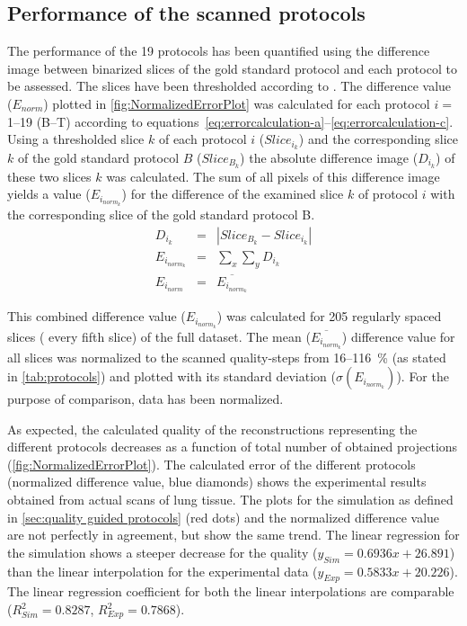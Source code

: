 \subsection{Performance of the scanned protocols}
The performance of the 19 protocols has been quantified using the difference image between binarized slices of the gold standard protocol and each protocol to be assessed. The slices have been thresholded according to \citet{Otsu1979}. The difference value ($E_{norm}$) plotted in \autoref{fig:NormalizedErrorPlot} was calculated for each protocol $i=$1--19 (B--T) according to equations~\ref{eq:errorcalculation-a}--\ref{eq:errorcalculation-c}. Using a thresholded slice $k$ of each protocol $i$ ($Slice_{i_{k}}$) and the corresponding slice $k$ of the gold standard protocol $B$ ($Slice_{B_{k}}$) the absolute difference image ($D_{i_{k}}$) of these two slices $k$ was calculated. The sum of all pixels of this difference image yields a value ($E_{i_{norm_{k}}}$) for the difference of the examined slice $k$ of protocol $i$ with the corresponding slice of the gold standard protocol B.
\begin{eqnarray}
	D_{i_{k}} &=& |Slice_{B_{k}}-Slice_{i_{k}}|\label{eq:errorcalculation-a}\\%
	E_{i_{norm_{k}}} &=& \sum_{x}\sum_{y} D_{i_{k}}\label{eq:errorcalculation-b}\\%
	E_{i_{norm}} &=& \overline{E_{i_{norm_{k}}}}\label{eq:errorcalculation-c}%
\end{eqnarray}

This combined difference value ($E_{i_{norm_{k}}}$) was calculated for 205 regularly spaced slices (%
every fifth slice) of the full dataset. The mean ($\overline{E_{i_{norm_{k}}}}$) difference value for all slices was normalized to the scanned quality-steps from 16--\SI{116}{\percent} (as stated in \autoref{tab:protocols}) and plotted with its standard deviation ($\sigma(E_{i_{norm_{k}}})$). For the purpose of comparison, data has been normalized.

As expected, the calculated quality of the reconstructions representing the different protocols decreases as a function of total number of obtained projections (\autoref{fig:NormalizedErrorPlot}). The calculated error of the different protocols (normalized difference value, blue diamonds) shows the experimental results obtained from actual scans of lung tissue. The plots for the simulation as defined in \autoref{sec:quality guided protocols} (red dots) and the normalized difference value are not perfectly in agreement, but show the same trend. The linear regression for the simulation shows a steeper decrease for the quality ($y_{Sim}=0.6936x+26.891$) than the linear interpolation for the experimental data ($y_{Exp}=0.5833x+20.226$). The linear regression coefficient for both the linear interpolations are comparable ($R^{2}_{Sim}=0.8287$, $R^{2}_{Exp}=0.7868$).

